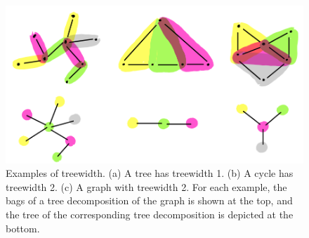 \begin{figure}
    \includegraphics[width=\textwidth]{figures/treewidth-example.png}
    \caption{Examples of treewidth. (a) A tree has treewidth 1. (b) A cycle has treewidth 2. (c) A graph with treewidth 2. For each example, the bags of a tree decomposition of the graph is shown at the top, and the tree of the corresponding tree decomposition is depicted at the bottom.}
    \label{fig:treewidth-example}
\end{figure} 